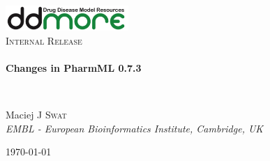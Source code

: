 \begin{titlepage}
\begin{center}

\includegraphics[width=0.35\textwidth]{./logo/ddmore_logo}~\\[1cm]

%
\textsc{\Large Internal Release}\\[0.5cm]

\HRule \\[0.4cm]
{ \huge \bfseries Changes in PharmML 0.7.3 \\[0.4cm] }

\HRule \\[1.5cm]

\begin{minipage}{0.75\textwidth}
\begin{flushleft} \large
Maciej J \textsc{Swat}\\
\emph{EMBL - European Bioinformatics Institute, Cambridge, UK} 
\end{flushleft}
\end{minipage}


\vfill



{\large \today \\}

\end{center}
\end{titlepage}